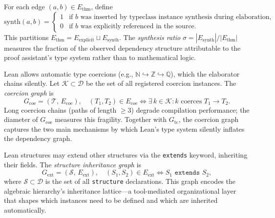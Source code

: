 \begin{definition}\label{def:synth-partition}
For each edge $(a, b) \in E_{\mathrm{thm}}$, define
\[
  \mathrm{synth}(a, b) =
  \begin{cases}
    1 & \text{if } b \text{ was inserted by typeclass instance synthesis during elaboration}, \\
    0 & \text{if } b \text{ was explicitly referenced in the source}.
  \end{cases}
\]
This partitions $E_{\mathrm{thm}} = E_{\mathrm{explicit}} \sqcup E_{\mathrm{synth}}$. The \emph{synthesis ratio} $\sigma = |E_{\mathrm{synth}}| / |E_{\mathrm{thm}}|$ measures the fraction of the observed dependency structure attributable to the proof assistant's type system rather than to mathematical logic.
\end{definition}

\begin{definition}\label{def:coercion-graph}
Lean allows automatic type coercions (e.g., $\mathbb{N} \hookrightarrow \mathbb{Z} \hookrightarrow \mathbb{Q}$), which the elaborator chains silently. Let $\mathcal{K} \subset \mathcal{D}$ be the set of all registered coercion instances. The \emph{coercion graph} is
\[
  G_{\mathrm{coe}} = (\mathcal{T},\, E_{\mathrm{coe}}), \quad (T_1, T_2) \in E_{\mathrm{coe}} \iff \exists\, k \in \mathcal{K} : k \text{ coerces } T_1 \to T_2.
\]
Long coercion chains (paths of length $\ge 3$) degrade compilation performance; the diameter of $G_{\mathrm{coe}}$ measures this fragility. Together with $G_{\mathrm{tc}}$, the coercion graph captures the two main mechanisms by which Lean's type system silently inflates the dependency graph.
\end{definition}

\begin{definition}\label{def:extends-graph}
Lean structures may extend other structures via the \texttt{extends} keyword, inheriting their fields. The \emph{structure inheritance graph} is
\[
  G_{\mathrm{ext}} = (\mathcal{S},\, E_{\mathrm{ext}}), \quad (S_1, S_2) \in E_{\mathrm{ext}} \iff S_1 \texttt{ extends } S_2,
\]
where $\mathcal{S} \subset \mathcal{D}$ is the set of all \texttt{structure} declarations. This graph encodes the algebraic hierarchy's inheritance lattice---a tool-mediated organizational layer that shapes which instances need to be defined and which are inherited automatically.
\end{definition}


